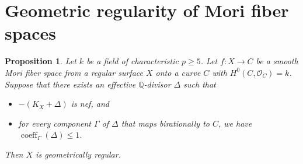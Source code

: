 \documentclass[reqno,oneside]{amsart}
\newtheorem{proposition}[theorem]{Proposition}
\theoremstyle{definition}
\theoremstyle{plain}
\numberwithin{equation}{section}
\newcommand\coeff{\operatorname{coeff}}
\begin{document}
\section{Geometric regularity of Mori fiber spaces}\label{section-MF}%
\begin{proposition}\label{proposition-MF-geo-normal}
  Let $k$ be a field of characteristic $p\ge5$.
  Let $f\colon X\to C$ be a smooth Mori fiber space from a regular surface $X$ onto a curve $C$ with $H^0(C, \mathcal{O}_C) = k$.
  Suppose that there exists an effective $\mathbb Q$-divisor  $\Delta$ such that
  \begin{itemize}
  \item[\rm(1)] $-(K_X + \Delta)$ is nef, and 
  \item[\rm(2)]
  for every component $\Gamma$ of $\Delta$ that maps birationally to $C$, we have $\coeff_\Gamma(\Delta) \le 1$.
  \end{itemize}
  Then $X$ is geometrically regular.
\end{proposition}
\end{document}
